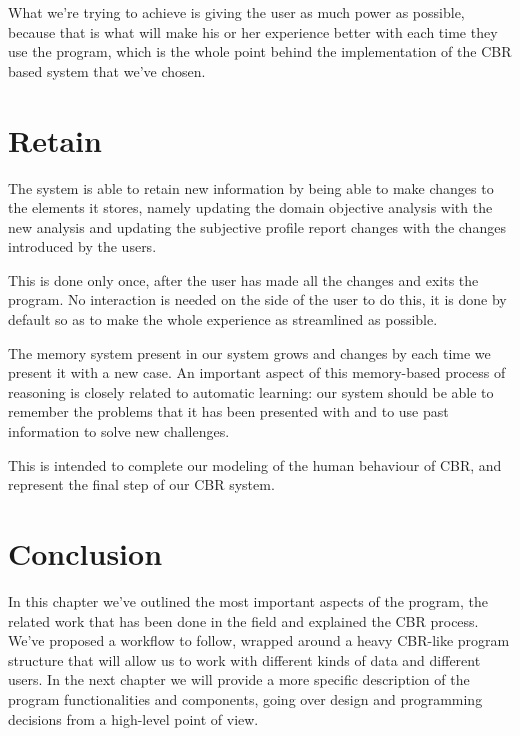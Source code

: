 What we're trying to achieve is giving the user as much power as possible, because that is what will make his or her experience better with each time they use the program, which is the whole point behind the implementation of the CBR based system that we've chosen.

\section{Retain}
\label{cap5:sec:retain}
The system is able to retain new information by being able to make changes to the elements it stores, namely updating the domain objective analysis with the new analysis and updating the subjective profile report changes with the changes introduced by the users.

This is done only once, after the user has made all the changes and exits the program. No interaction is needed on the side of the user to do this, it is done by default so as to make the whole experience as streamlined as possible.

The memory system present in our system grows and changes by each time we present it with a new case. An important aspect of this memory-based process of reasoning is closely related to automatic learning: our system should be able to remember the problems that it has been presented with and to use past information to solve new challenges.

This is intended to complete our modeling of the human behaviour of CBR, and represent the final step of our CBR system.

\section{Conclusion}
In this chapter we've outlined the most important aspects of the program, the related work that has been done in the field and explained the CBR process.
We've proposed a workflow to follow, wrapped around a heavy CBR-like program structure that will allow us to work with different kinds of data and different users.
In the next chapter we will provide a more specific description of the program functionalities and components, going over design and programming decisions from a high-level point of view.
\medskip
